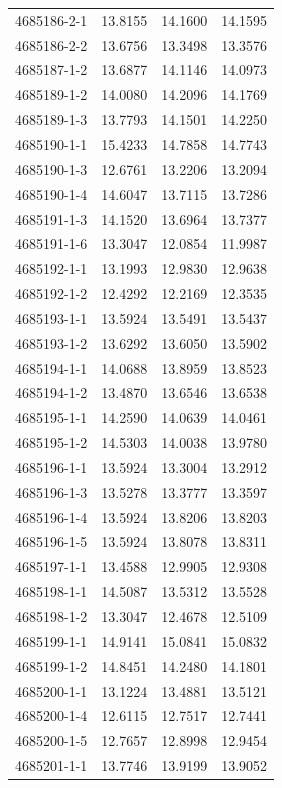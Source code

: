 \begin{longtable}{lrrr}
4685186-2-1 & 13.8155 & 14.1600 & 14.1595 \\
4685186-2-2 & 13.6756 & 13.3498 & 13.3576 \\
4685187-1-2 & 13.6877 & 14.1146 & 14.0973 \\
4685189-1-2 & 14.0080 & 14.2096 & 14.1769 \\
4685189-1-3 & 13.7793 & 14.1501 & 14.2250 \\
4685190-1-1 & 15.4233 & 14.7858 & 14.7743 \\
4685190-1-3 & 12.6761 & 13.2206 & 13.2094 \\
4685190-1-4 & 14.6047 & 13.7115 & 13.7286 \\
4685191-1-3 & 14.1520 & 13.6964 & 13.7377 \\
4685191-1-6 & 13.3047 & 12.0854 & 11.9987 \\
4685192-1-1 & 13.1993 & 12.9830 & 12.9638 \\
4685192-1-2 & 12.4292 & 12.2169 & 12.3535 \\
4685193-1-1 & 13.5924 & 13.5491 & 13.5437 \\
4685193-1-2 & 13.6292 & 13.6050 & 13.5902 \\
4685194-1-1 & 14.0688 & 13.8959 & 13.8523 \\
4685194-1-2 & 13.4870 & 13.6546 & 13.6538 \\
4685195-1-1 & 14.2590 & 14.0639 & 14.0461 \\
4685195-1-2 & 14.5303 & 14.0038 & 13.9780 \\
4685196-1-1 & 13.5924 & 13.3004 & 13.2912 \\
4685196-1-3 & 13.5278 & 13.3777 & 13.3597 \\
4685196-1-4 & 13.5924 & 13.8206 & 13.8203 \\
4685196-1-5 & 13.5924 & 13.8078 & 13.8311 \\
4685197-1-1 & 13.4588 & 12.9905 & 12.9308 \\
4685198-1-1 & 14.5087 & 13.5312 & 13.5528 \\
4685198-1-2 & 13.3047 & 12.4678 & 12.5109 \\
4685199-1-1 & 14.9141 & 15.0841 & 15.0832 \\
4685199-1-2 & 14.8451 & 14.2480 & 14.1801 \\
4685200-1-1 & 13.1224 & 13.4881 & 13.5121 \\
4685200-1-4 & 12.6115 & 12.7517 & 12.7441 \\
4685200-1-5 & 12.7657 & 12.8998 & 12.9454 \\
4685201-1-1 & 13.7746 & 13.9199 & 13.9052 \\

\end{longtable}
